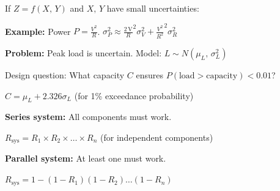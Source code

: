 \begin{Shaded}
\begin{Highlighting}[]
 \OperatorTok{=} \OperatorTok{;}
 \OperatorTok{=} \NormalTok{(}\NormalTok{(} \OperatorTok{{-}} \NormalTok{) }\OperatorTok{\textless{}} \OperatorTok{*}\NormalTok{)}\OperatorTok{;}
\NormalTok{(}\OperatorTok{,} \OperatorTok{*}\NormalTok{)}\OperatorTok{;}
\end{Highlighting}
\end{Shaded}


If $Z = f(X,\, Y)$ and $X,\, Y$ have small uncertainties:


\textbf{Example:} Power $P = \frac{V^{2}}{R}$. $\sigma_{P}^{2} \approx \frac{2\,\mathrm{V}}{R}^{2}\sigma_{V}^{2} + \frac{V^{2}}{R^{2}}^{2}\sigma_{R}^{2}$



\textbf{Problem:} Peak load is uncertain. Model: $L \sim N(\mu_{L},\, \sigma_{L}^{2})$

Design question: What capacity $C$ ensures $P(\text{load} > \text{capacity}) < 0.01$?

$C = \mu_{L} + 2.326\sigma_{L}$ (for 1\% exceedance probability)


\textbf{Series system:} All components must work.

$R_{\mathrm{sys}} = R_{1} \times R_{2} \times \ldots \times R_{n}$ (for independent components)

\textbf{Parallel system:} At least one must work.

$R_{\mathrm{sys}} = 1 - (1-R_{1})(1-R_{2})\ldots (1-R_{n})$


